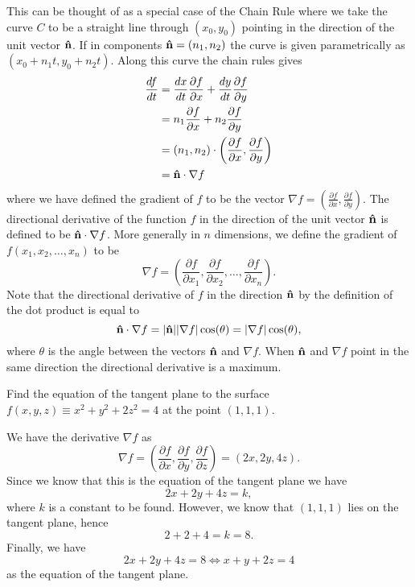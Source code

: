 \documentclass[10pt, a4paper]{article}
\begin{document}
This can be thought of as a special case of the Chain Rule where we take the curve $C$ to be a straight line through $(x_0, y_0)$ pointing in the direction of the unit vector $\mathbf{\hat{n}}$.
If in components $\mathbf{\hat{n}} = (n_1, n_2)$ the curve is given parametrically as $(x_0 + n_1t, y_0 + n_2t)$.
Along this curve the chain rules gives
\begin{align*}
    \frac{df}{dt} &= \frac{dx}{dt}\frac{\partial f}{\partial x} + \frac{dy}{dt}\frac{\partial f}{\partial y} \\
    &= n_1\frac{\partial f}{\partial x} + n_2\frac{\partial f}{\partial y} \\
    &= (n_1, n_2) \cdot \left(\frac{\partial f}{\partial x}, \frac{\partial f}{\partial y}\right) \\
    &= \mathbf{\hat{n}} \cdot \nabla f
\end{align*}
where we have defined the gradient of $f$ to be the vector $\nabla f = \left(\frac{\partial f}{\partial x}, \frac{\partial f}{\partial y}\right)$.
The directional derivative of the function $f$ in the direction of the unit vector $\mathbf{\hat{n}}$ is defined to be $\mathbf{\hat{n}} \cdot \nabla f$.
More generally in $n$ dimensions,
we define the gradient of $f(x_1, x_2, \dotsc, x_n)$ to be
\[
\nabla f = \left(\frac{\partial f}{\partial x_1}, \frac{\partial f}{\partial x_2}, \dotsc, \frac{\partial f}{\partial x_n}\right).
\]
Note that the directional derivative of $f$ in the direction $\mathbf{\hat{n}}$ by the definition of the dot product is equal to
\[
\mathbf{\hat{n}}\cdot \nabla f = |\mathbf{\hat{n}}||\nabla f|\cos(\theta) = |\nabla f|\cos(\theta),
\]
where $\theta$ is the angle between the vectors $\mathbf{\hat{n}}$ and $\nabla f$.
When $\mathbf{\hat{n}}$ and $\nabla f$ point in the same direction the directional derivative is a maximum.

\begin{example}
    Find the equation of the tangent plane to the surface $f(x, y, z) \equiv x ^ 2 + y ^ 2 + 2z ^ 2 = 4$ at the point $(1, 1, 1)$.
    \begin{solution}
        We have the derivative $\nabla f$ as
        \[
        \nabla f = \left(\frac{\partial f}{\partial x}, \frac{\partial f}{\partial y}, \frac{\partial f}{\partial z}\right) = (2x, 2y, 4z).
        \]
        Since we know that this is the equation of the tangent plane we have
        \[
        2x + 2y + 4z = k,
        \]
        where $k$ is a constant to be found.
        However,
        we know that $(1, 1, 1)$ lies on the tangent plane,
        hence
        \[
        2 + 2 + 4 = k = 8.
        \]
        Finally,
        we have
        \[
        2x + 2y + 4z = 8 \iff x + y + 2z = 4
        \]
        as the equation of the tangent plane.
    \end{solution}
\end{example}
\end{document}

